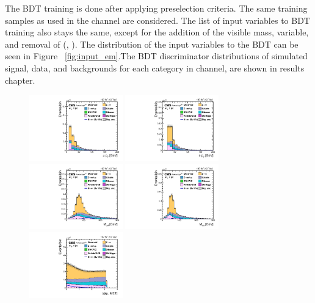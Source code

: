 The BDT training is done after applying preselection criteria. The same training samples as used in the \Hmue channel are considered. The list of input variables to BDT training also stays the same, except for the addition of the visible mass, \mvis variable, and removal of \mt(\Pe, \ptvecmiss). The distribution of the input variables to the BDT can be seen in Figure ~\ref{fig:input_em}.The BDT discriminator distributions of simulated signal, data, and backgrounds for each category in \Hemu channel, are shown in results chapter.

\begin{figure}[htbp!]
  \centering
  \includegraphics[width=0.36\textwidth]{plots/chapter6/emu/mPt.pdf}
  \includegraphics[width=0.36\textwidth]{plots/chapter6/emu/ePt.pdf}\\
  \includegraphics[width=0.36\textwidth]{plots/chapter6/emu/e_m_CollMass.pdf}
  \includegraphics[width=0.36\textwidth]{plots/chapter6/emu/e_m_Mass.pdf}\\
  \includegraphics[width=0.36\textwidth]{plots/chapter6/emu/dPhiMuMET.pdf}

\end{figure}
